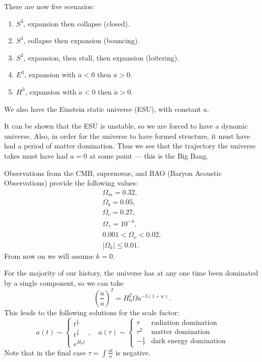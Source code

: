 \documentclass{jknotes}
\begin{document}
There are now five scenarios:
\begin{enumerate}
    \item \(S^3\), expansion then collapse (closed).
    \item \(S^3\), collapse then expansion (bouncing).
    \item \(S^3\), expansion, then stall, then expansion (loitering).
    \item \(E^3\), expansion with \(\ddot{a}<0\) then \(\ddot{a}>0\).
    \item \(H^3\), expansion with \(\ddot{a}<0\) then \(\ddot{a}>0\).
\end{enumerate}
We also have the Einstein static universe (ESU), with constant \(a\). 

It can be shown that the ESU is unstable, so we are forced to have a dynamic universe. Also, in order for the universe to have formed structure, it must have had a period of matter domination. Thus we see that the trajectory the universe takes must have had \(a=0\) at some point --- this is the Big Bang.

Observations from the CMB, supernovae, and BAO (Baryon Acoustic Observations) provide the following values:
\begin{equation}
    \begin{matrix}
        \Omega_m = 0.32,\\
        \Omega_b=0.05,\\
        \Omega_c=0.27,\\
        \Omega_\gamma = 10^{-4},\\
        0.001 < \Omega_\nu < 0.02,\\
        |\Omega_k| \le 0.01.
    \end{matrix}
\end{equation}
From now on we will assume \(k=0\).

For the majority of our history, the universe has at any one time been dominated by a single component, so we can take
\begin{equation}
    \left(\frac{\dot{a}}{a}\right)^2 = H_0^2\Omega a^{-3(1+w)}.
\end{equation}
This leads to the following solutions for the scale factor:
\begin{equation}
    a(t) \sim
    \begin{cases}
        t^{\frac{1}{2}} \\
        t^{\frac{2}{3}} \\
        e^{H_0 t}
    \end{cases},\quad
    a(\tau) \sim
    \begin{cases}
        \tau & \text{radiation domination} \\
        \tau^2 & \text{matter domination} \\
        -\frac{1}{\tau} & \text{dark energy domination}
    \end{cases}
\end{equation}
Note that in the final case \(\tau = \int\frac{\dd{t}}{a}\) is negative.
\end{document}

